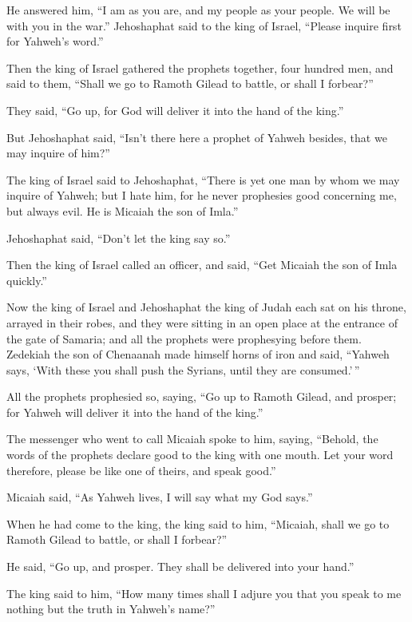 He answered him, ``I am as you are, and my people as your people. We
will be with you in the war.''  Jehoshaphat said to the
king of Israel, ``Please inquire first for Yahweh's word.''

 Then the king of Israel gathered the prophets together,
four hundred men, and said to them, ``Shall we go to Ramoth Gilead to
battle, or shall I forbear?''

They said, ``Go up, for God will deliver it into the hand of the king.''

 But Jehoshaphat said, ``Isn't there here a prophet of
Yahweh besides, that we may inquire of him?''

 The king of Israel said to Jehoshaphat, ``There is yet
one man by whom we may inquire of Yahweh; but I hate him, for he never
prophesies good concerning me, but always evil. He is Micaiah the son of
Imla.''

Jehoshaphat said, ``Don't let the king say so.''

 Then the king of Israel called an officer, and said,
``Get Micaiah the son of Imla quickly.''

 Now the king of Israel and Jehoshaphat the king of Judah
each sat on his throne, arrayed in their robes, and they were sitting in
an open place at the entrance of the gate of Samaria; and all the
prophets were prophesying before them.  Zedekiah the son
of Chenaanah made himself horns of iron and said, ``Yahweh says, `With
these you shall push the Syrians, until they are consumed.'\,''

 All the prophets prophesied so, saying, ``Go up to
Ramoth Gilead, and prosper; for Yahweh will deliver it into the hand of
the king.''

 The messenger who went to call Micaiah spoke to him,
saying, ``Behold, the words of the prophets declare good to the king
with one mouth. Let your word therefore, please be like one of theirs,
and speak good.''

 Micaiah said, ``As Yahweh lives, I will say what my God
says.''

 When he had come to the king, the king said to him,
``Micaiah, shall we go to Ramoth Gilead to battle, or shall I forbear?''

He said, ``Go up, and prosper. They shall be delivered into your hand.''

 The king said to him, ``How many times shall I adjure
you that you speak to me nothing but the truth in Yahweh's name?''

